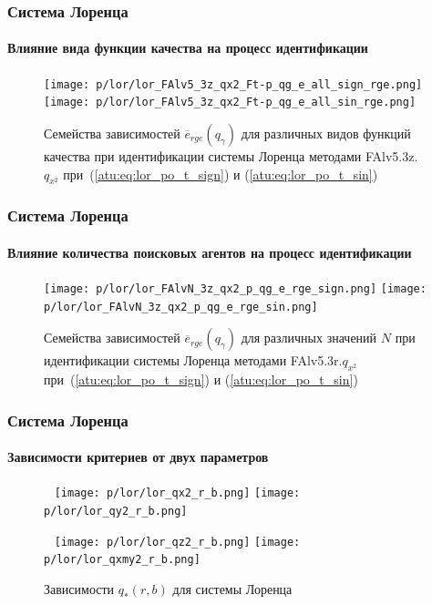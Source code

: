 \documentclass[10pt,utf8]{beamer}
\begin{document}
\begin{frame}
  \frametitle{Система Лоренца}
  \framesubtitle{Влияние вида функции качества на процесс идентификации}

  \begin{figure}[h!]
    \centerline{
      \texttt{[image: p/lor/lor\_FAlv5\_3z\_qx2\_Ft-p\_qg\_e\_all\_sign\_rge.png]}
      \hfill
      \texttt{[image: p/lor/lor\_FAlv5\_3z\_qx2\_Ft-p\_qg\_e\_all\_sin\_rge.png]}
    }
    \caption{Семейства зависимостей $\overline{e}_{rge}(q_\gamma)$ для различных видов функций качества при идентификации системы Лоренца методами FAlv5.3z.$q_{x^2}$
     при~(\ref{atu:eq:lor_po_t_sign}) и (\ref{atu:eq:lor_po_t_sin})}
    \label{atu:f:lor_ftype_rge}
  \end{figure}

\end{frame}



\begin{frame}
  \frametitle{Система Лоренца}
  \framesubtitle{Влияние количества поисковых агентов на процесс идентификации}


  \begin{figure}[h!]
    \centerline{
      \texttt{[image: p/lor/lor\_FAlvN\_3z\_qx2\_p\_qg\_e\_rge\_sign.png]}
      \hfill
      \texttt{[image: p/lor/lor\_FAlvN\_3z\_qx2\_p\_qg\_e\_rge\_sin.png]}
    }
    \caption{Семейства зависимостей $\overline{e}_{rge}(q_\gamma)$ для различных значений $N$ при идентификации системы Лоренца методами FAlv5.3r.$q_{x^2}$
     при~(\ref{atu:eq:lor_po_t_sign}) и (\ref{atu:eq:lor_po_t_sin})}
    \label{atu:f:lor_N_rge}
  \end{figure}


\end{frame}



\begin{frame}
  \frametitle{Система Лоренца}
  \framesubtitle{Зависимости критериев от двух параметров}


  \begin{figure}[h!]
    \centerline{
      {~}\hfill
      \texttt{[image: p/lor/lor\_qx2\_r\_b.png]}
      \hfill
      \texttt{[image: p/lor/lor\_qy2\_r\_b.png]}
      \hfill{~}
    }
    \centerline{
      {~}\hfill
      \texttt{[image: p/lor/lor\_qz2\_r\_b.png]}
      \hfill
      \texttt{[image: p/lor/lor\_qxmy2\_r\_b.png]}
      \hfill{~}
    }
    \caption{Зависимости $q_{*}(r,b)$ для системы Лоренца }
    \label{atu:f:lor_qrb}
  \end{figure}


\end{frame}
\end{document}
